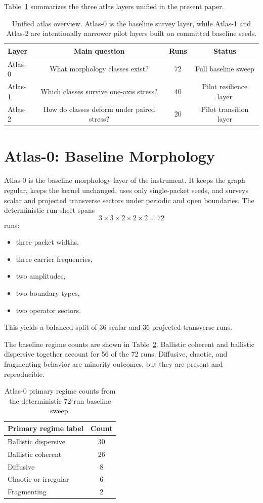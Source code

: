 \documentclass[11pt]{article}
\begin{document}
Table~\ref{tab:atlas-overview} summarizes the three atlas layers unified in the present paper.

\begin{table}[t]
\centering
\begin{tabular}{lccc}
\hline
Layer & Main question & Runs & Status \\
\hline
Atlas-0 & What morphology classes exist? & 72 & Full baseline sweep \\
Atlas-1 & Which classes survive one-axis stress? & 40 & Pilot resilience layer \\
Atlas-2 & How do classes deform under paired stress? & 20 & Pilot transition layer \\
\hline
\end{tabular}
\caption{Unified atlas overview. Atlas-0 is the baseline survey layer, while Atlas-1 and Atlas-2 are intentionally narrower pilot layers built on committed baseline seeds.}
\label{tab:atlas-overview}
\end{table}

\section{Atlas-0: Baseline Morphology}
Atlas-0 is the baseline morphology layer of the instrument. It keeps the graph regular, keeps the kernel unchanged, uses only single-packet seeds, and surveys scalar and projected transverse sectors under periodic and open boundaries. The deterministic run sheet spans
\begin{equation}
3 \times 3 \times 2 \times 2 \times 2 = 72
\end{equation}
runs:
\begin{itemize}
\item three packet widths,
\item three carrier frequencies,
\item two amplitudes,
\item two boundary types,
\item two operator sectors.
\end{itemize}
This yields a balanced split of 36 scalar and 36 projected-transverse runs.

The baseline regime counts are shown in Table~\ref{tab:atlas0-counts}. Ballistic coherent and ballistic dispersive together account for 56 of the 72 runs. Diffusive, chaotic, and fragmenting behavior are minority outcomes, but they are present and reproducible.

\begin{table}[t]
\centering
\begin{tabular}{lc}
\hline
Primary regime label & Count \\
\hline
Ballistic dispersive & 30 \\
Ballistic coherent & 26 \\
Diffusive & 8 \\
Chaotic or irregular & 6 \\
Fragmenting & 2 \\
\hline
\end{tabular}
\caption{Atlas-0 primary regime counts from the deterministic 72-run baseline sweep.}
\label{tab:atlas0-counts}
\end{table}
\end{document}
